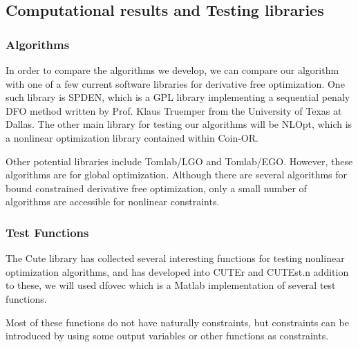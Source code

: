 \documentclass{article}
\begin{document}
\subsection{Computational results and Testing libraries}

\subsubsection{Algorithms}
In order to compare the algorithms we develop, we can compare our algorithm with one of a few current software libraries for derivative free optimization.
One such library is SPDEN, which is a GPL library implementing a sequential penaly DFO method written by Prof. Klaus Truemper from the University of Texas at Dallas.
The other main library for testing our algorithms will be NLOpt, which is a nonlinear optimization library contained within Coin-OR.

Other potential libraries include Tomlab/LGO and Tomlab/EGO.
However, these algorithms are for global optimization.
Although there are several algorithms for bound constrained derivative free optimization, only a small number of algorithms are accessible for nonlinear constraints.



\subsubsection{Test Functions}
The Cute library has collected several interesting functions for testing nonlinear optimization algorithms, and has developed into CUTEr and CUTEst.n addition to these, we will used dfovec which is a Matlab implementation of several test functions.

Most of these functions do not have naturally constraints, but constraints can be introduced by using some output variables or other functions as constraints.


\end{document}
